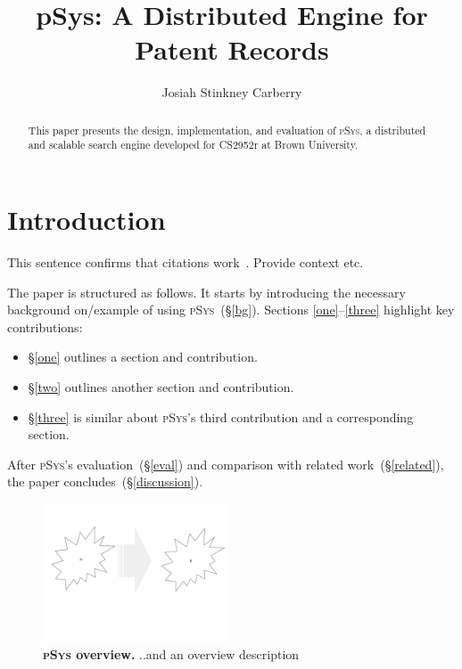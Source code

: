 \documentclass[sigplan, screen, 10pt]{acmart}
\title{pSys: A Distributed Engine for Patent Records}
\author{Josiah Stinkney Carberry}
\affiliation{Brown University}
\newcommand{\sx}[1]{(\S\ref{#1})}
\newcommand{\sys}{{\scshape pSys}\xspace}
\begin{document}
\begin{abstract}
This paper presents the design, implementation, and evaluation of \sys, a distributed and scalable search engine developed for CS2952r at Brown University.
\end{abstract}

\maketitle


\section{Introduction}
\label{intro}

This sentence confirms that citations work~\cite{kpn74, dryad07}. Provide
context etc.

The paper is structured as follows.
It starts by introducing the necessary background on/example of using \sys~\sx{bg}.
Sections \ref{one}--\ref{three} highlight key contributions:
\begin{itemize}
	\item
	\S\ref{one}
		outlines a section and contribution.

	\item
	\S\ref{two} outlines another section and contribution.

	\item
	\S\ref{three} is similar about \sys's third contribution and a corresponding section.

\end{itemize}

\noindent
After \sys's evaluation~\sx{eval} and  comparison with related work~\sx{related}, the paper concludes~\sx{discussion}.  

\begin{figure}[t]
\centering
\includegraphics[width=0.49\textwidth]{./figs/cs2952r.pdf}
\caption{
  \textbf{\sys overview.}
  ..and an overview description
}
\vspace{-18pt}
\label{fig:overview}
\end{figure}
\end{document}
